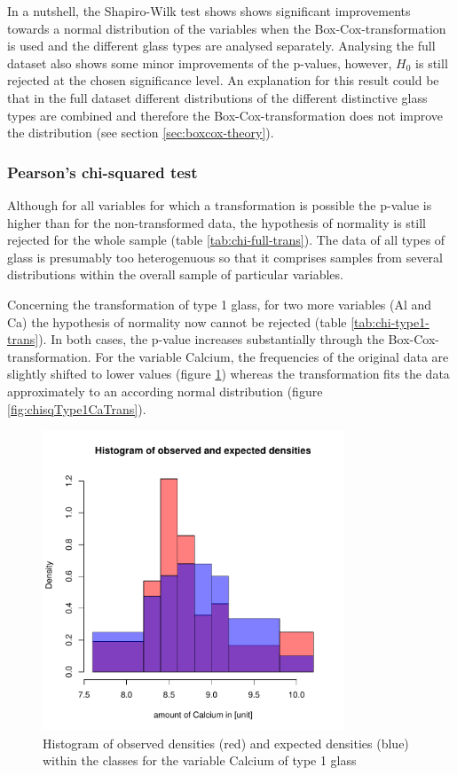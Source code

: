 \documentclass[a4paper, 12pt, titlepage, headsepline, listof = totoc, bibliography = totoc, numbers = noenddot]{scrartcl}
\begin{document}
In a nutshell, the Shapiro-Wilk test shows shows significant improvements towards a normal distribution of the variables when the Box-Cox-transformation is used and the different glass types are analysed separately. Analysing the full dataset also shows some minor improvements of the p-values, however, $H_0$ is still rejected at the chosen significance level. An explanation for this result could be that in the full dataset different distributions of the different distinctive glass types are combined and therefore the Box-Cox-transformation does not improve the distribution (see section \ref{sec:boxcox-theory}).







\subsubsection{Pearson's chi-squared test}
Although for all variables for which a transformation is possible the p-value is higher than for the non-transformed data, the hypothesis of normality is still rejected for the whole sample (table \ref{tab:chi-full-trans}). The data of all types of glass is presumably too heterogenuous so that it comprises samples from several distributions within the overall sample of particular variables.

Concerning the transformation of type 1 glass, for two more variables (Al and Ca) the hypothesis of normality now cannot be rejected (table \ref{tab:chi-type1-trans}). In both cases, the p-value increases substantially through the Box-Cox-transformation. For the variable Calcium, the frequencies of the original data are slightly shifted to lower values (figure \ref{fig:chisqType1Ca}) whereas the transformation fits the data approximately to an according normal distribution (figure \ref{fig:chisqType1CaTrans}).

\begin{figure}[h!]
\centering
\includegraphics[width=0.8\textwidth]{report-chisqType1Ca}
\caption{Histogram of observed densities (red) and expected densities (blue) within the classes for the variable Calcium of type 1 glass}
\label{fig:chisqType1Ca}
\end{figure}
\end{document}
